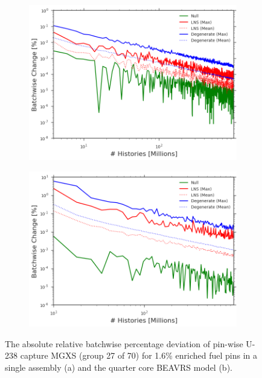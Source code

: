 \begin{figure}[h!]
\centering
\begin{subfigure}{.87\textwidth}
  \centering
  \includegraphics[width=\linewidth]{figures/patterns/convergence/assm-16/assm-16-dev-capture-27}
  \caption{}
  \label{fig:chap9-assm-16-dev-capt-27}
\end{subfigure}
\begin{subfigure}{.87\textwidth}
  \centering
  \includegraphics[width=\linewidth]{figures/patterns/convergence/full-core/16-enr-dev-capture-27}
  \caption{}
  \label{fig:chap9-full-core-dev-capt-27}
\end{subfigure}
\caption[Convergence of U-238 capture MGXS batchwise deviation]{The absolute relative batchwise percentage deviation of pin-wise U-238 capture \ac{MGXS} (group 27 of 70) for 1.6\% enriched fuel pins in a single assembly (a) and the quarter core \ac{BEAVRS} model (b).}
\label{fig:chap9-capt-27-dev}
\end{figure}

